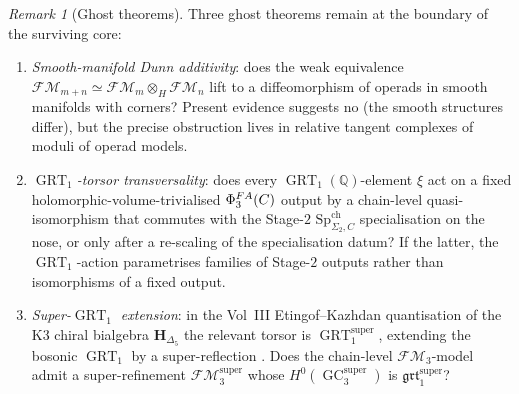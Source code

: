\documentclass[11pt]{article}
\theoremstyle{definition}
\theoremstyle{remark}
\newtheorem{remark}[theorem]{Remark}
\DeclareMathOperator{\GC}{GC}
\DeclareMathOperator{\GRT}{GRT}
\newcommand{\FM}{\mathcal{FM}}
\newcommand{\PhiFA}{\Phi^{\mathrm{FA}}}
\newcommand{\SpCh}{\mathrm{Sp}^{\mathrm{ch}}}
\begin{document}
\begin{remark}[Ghost theorems]
\label{rem:ghost-theorems}
Three ghost theorems remain at the boundary of the surviving core:
\begin{enumerate}
 \item[(G1)] \emph{Smooth-manifold Dunn additivity}: does the weak
             equivalence $\FM_{m+n} \simeq \FM_m \otimes_H \FM_n$ lift
             to a diffeomorphism of operads in smooth manifolds with
             corners? Present evidence suggests no (the smooth
             structures differ), but the precise obstruction lives in
             relative tangent complexes of moduli of operad models.
 \item[(G2)] \emph{$\GRT_1$-torsor transversality}: does every
             $\GRT_1(\mathbb{Q})$-element $\xi$ act on a fixed
             holomorphic-volume-trivialised $\PhiFA_3(\cC)$ output by
             a chain-level quasi-isomorphism that commutes with the
             Stage-$2$ $\SpCh_{\Sigma_2, C}$ specialisation on the
             nose, or only after a re-scaling of the specialisation
             datum? If the latter, the $\GRT_1$-action parametrises
             families of Stage-$2$ outputs rather than isomorphisms
             of a fixed output.
 \item[(G3)] \emph{Super-$\GRT_1$ extension}: in the Vol~III
             Etingof--Kazhdan quantisation of the K3 chiral bialgebra
             $\mathbf H_{\Delta_5}$ the relevant torsor is
             $\GRT_1^{\mathrm{super}}$, extending the bosonic
             $\GRT_1$ by a super-reflection \cite[AP-CY42,
             \texttt{notes/antipatterns\_catalogue.md}]{VolIII-APCY}.
             Does the chain-level $\FM_3$-model admit a super-refinement
             $\FM_3^{\mathrm{super}}$ whose $H^0(\GC_3^{\mathrm{super}})$
             is $\mathfrak{grt}_1^{\mathrm{super}}$?
\end{enumerate}
\end{remark}
\end{document}
